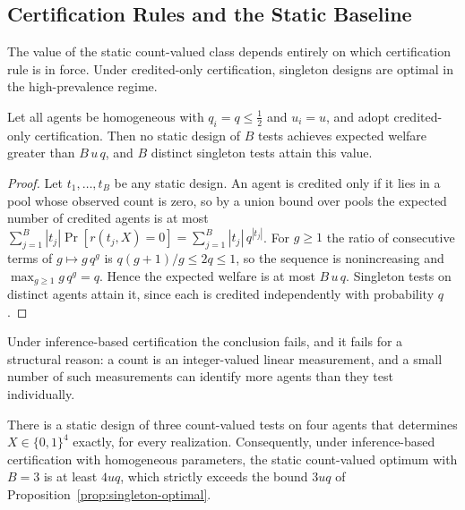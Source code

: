 \subsection{Certification Rules and the Static Baseline}
\label{sec:anatomy-certification}

The value of the static count-valued class depends entirely on which
certification rule is in force. Under credited-only certification, singleton
designs are optimal in the high-prevalence regime.

\begin{proposition}
\label{prop:singleton-optimal}
Let all agents be homogeneous with $q_i=q\le\tfrac12$ and $u_i=u$, and adopt
credited-only certification. Then no static design of $B$ tests achieves
expected welfare greater than $B\,u\,q$, and $B$ distinct singleton tests attain
this value.
\end{proposition}

\begin{proof}
Let $t_1,\ldots,t_B$ be any static design. An agent is credited only if it lies
in a pool whose observed count is zero, so by a union bound over pools the
expected number of credited agents is at most
$\sum_{j=1}^{B}|t_j|\Pr[r(t_j,X)=0]=\sum_{j=1}^{B}|t_j|\,q^{|t_j|}$.
For $g\ge1$ the ratio of consecutive terms of $g\mapsto g\,q^{g}$ is
$q(g+1)/g\le 2q\le 1$, so the sequence is nonincreasing and
$\max_{g\ge1} g\,q^{g}=q$. Hence the expected welfare is at most $B\,u\,q$.
Singleton tests on distinct agents attain it, since each is credited
independently with probability $q$.
\end{proof}

Under inference-based certification the conclusion fails, and it fails for a
structural reason: a count is an integer-valued linear measurement, and a small
number of such measurements can identify more agents than they test
individually.

\begin{proposition}
\label{prop:coin-weighing}
There is a static design of three count-valued tests on four agents that
determines $X\in\{0,1\}^{4}$ exactly, for every realization. Consequently, under
inference-based certification with homogeneous parameters, the static
count-valued optimum with $B=3$ is at least $4uq$, which strictly exceeds the
bound $3uq$ of Proposition~\ref{prop:singleton-optimal}.
\end{proposition}

